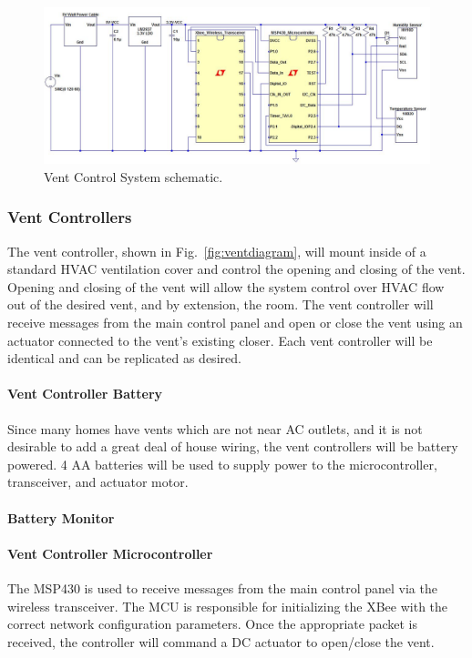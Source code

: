 \begin{figure} [htb]
\centering
\includegraphics[width=.99\textwidth]{Vent_System.JPG}
\caption{Vent Control System schematic.}
\label{fig:Vent_System}
\end{figure}

\subsubsection{Vent Controllers}
The vent controller, shown in Fig.~\ref{fig:ventdiagram}, will mount inside of a standard HVAC ventilation cover and control the opening and closing of the vent.  Opening and closing of the vent will allow the system control over HVAC flow out of the desired vent, and by extension, the room. The vent controller will receive messages from the main control panel and open or close the vent using an actuator connected to the vent's existing closer. Each vent controller will be identical and can be replicated as desired.
\paragraph{Vent Controller Battery}
Since many homes have vents which are not near AC outlets, and it is not desirable to add a great deal of house wiring, the vent controllers will be battery powered.  4 AA batteries will be used to supply power to the microcontroller, transceiver, and actuator motor.
\paragraph{Battery Monitor}
\paragraph{Vent Controller Microcontroller}
The MSP430 is used to receive messages from the main control panel via the wireless transceiver.  The MCU is responsible for initializing the XBee with the correct network configuration parameters.  Once the appropriate packet is received, the controller will command a DC actuator to open/close the vent.
